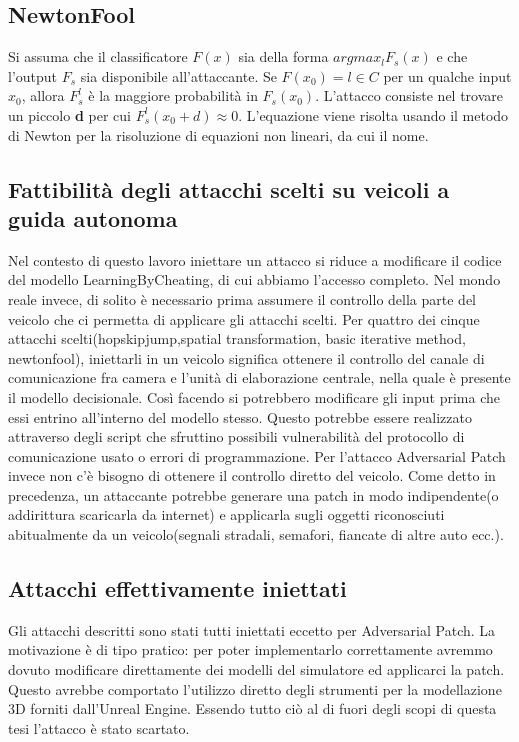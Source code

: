 \subsection{NewtonFool}
\cite{newton}
Si assuma che  il classificatore $F(x)$ sia della forma $arg max_l F_s(x)$ e che l'output $F_s$ sia disponibile all'attaccante. Se $F(x_0) = l \in C$ per un qualche  input $x_0$, allora $F^l_s$ è la maggiore probabilità
in $F_s(x_0)$. L'attacco consiste nel trovare un piccolo \textbf{d} per cui $F^l_s(x_0 + d) \approx 0$. L'equazione viene risolta usando il metodo di Newton
per la risoluzione di equazioni non lineari, da cui il nome.

\subsection{Fattibilità degli attacchi scelti su veicoli a guida autonoma}
Nel contesto di questo lavoro iniettare un attacco si riduce a modificare il codice del modello LearningByCheating, di cui abbiamo l'accesso completo. Nel  mondo reale invece, di solito è necessario prima assumere il controllo della parte del  veicolo che ci permetta di applicare gli attacchi scelti.
Per quattro dei cinque attacchi scelti(hopskipjump,spatial transformation, basic iterative method, newtonfool), iniettarli in un veicolo significa ottenere il controllo del canale
di comunicazione fra camera e l'unità di elaborazione centrale, nella quale è presente il modello decisionale. Così facendo si potrebbero  modificare gli input prima che essi entrino
all'interno del modello stesso. Questo potrebbe essere realizzato attraverso degli script che sfruttino possibili vulnerabilità del protocollo di comunicazione usato o errori di programmazione.
Per l'attacco Adversarial Patch invece non c'è bisogno  di ottenere il controllo diretto del veicolo. Come detto in precedenza, un attaccante potrebbe generare
una patch in modo indipendente(o addirittura scaricarla da internet) e applicarla sugli oggetti riconosciuti abitualmente da un veicolo(segnali stradali, semafori, fiancate di altre auto ecc.).
\subsection{Attacchi effettivamente iniettati}
Gli attacchi  descritti sono stati tutti iniettati eccetto per Adversarial Patch. La motivazione è di tipo pratico: per poter implementarlo correttamente
avremmo dovuto modificare direttamente dei modelli del simulatore ed applicarci la patch. Questo avrebbe comportato l'utilizzo diretto degli strumenti
per la modellazione 3D forniti dall'Unreal Engine. Essendo tutto ciò al di fuori degli scopi di questa tesi l'attacco è stato scartato.
